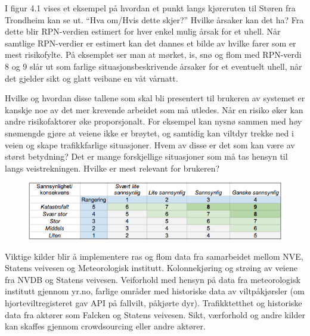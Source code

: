 \documentclass[a4paper,norsk,oneside]{book}
\begin{document}
\noindent
I figur 4.1 vises et eksempel på hvordan et punkt langs kjøreruten til Støren fra Trondheim kan se ut. “Hva om/Hvis dette skjer?” Hvilke årsaker kan det ha? Fra dette blir RPN-verdien estimert for hver enkel mulig årsak for et uhell. Når samtlige RPN-verdier er estimert kan det dannes et bilde av hvilke farer som er mest risikofylte. På eksemplet ser man at mørket, is, snø og flom med RPN-verdi 8 og 9 slår ut som farlige situasjonsbeskrivende årsaker for et eventuelt uhell, når det gjelder sikt og glatt veibane en våt vårnatt.

Hvilke og hvordan disse tallene som skal bli presentert til brukeren av systemet er kanskje noe av det mer krevende arbeidet som må utledes. Når en risiko øker kan andre risikofaktorer øke proporsjonalt. For eksempel kan nysnø sammen med høy snømengde gjøre at veiene ikke er brøytet, og samtidig kan viltdyr trekke ned i veien og skape trafikkfarlige situasjoner. Hvem av disse er det som kan være av størst betydning? Det er mange forskjellige situasjoner som må tas hensyn til langs veistrekningen. Hvilke er mest relevant for brukeren?

\begin{figure}[H]
\centering
\includegraphics[scale=0.5]{figs/risiko2}
\label{fig:risiko1}
\end{figure}
\noindent
Viktige kilder blir å implementere ras og flom data fra samarbeidet mellom NVE, Statens veivesen og Meteorologisk institutt. Kolonnekjøring og strøing av veiene fra NVDB og Statens veivesen. Veiforhold med hensyn på data fra meteorologisk institutt gjennom yr.no, farlige områder med historiske data av viltpåkjørsler (om hjorteviltregisteret gav API på fallvilt, påkjørte dyr). Trafikktetthet og historiske data fra aktører som Falcken og Statens veivesen. Sikt, værforhold og andre kilder kan skaffes gjennom crowdsourcing eller andre aktører.
\end{document}

